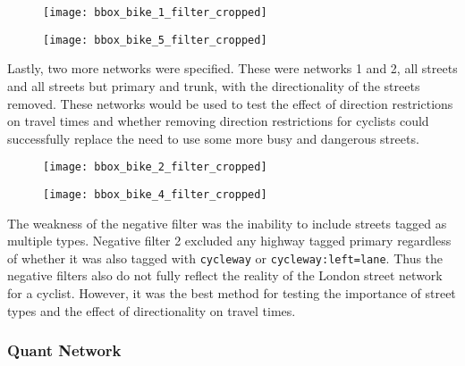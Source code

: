 \begin{figure}
\centering
\begin{minipage}{.5\textwidth}
  \centering
  \texttt{[image: bbox\_bike\_1\_filter\_cropped]}
  \label{fig:sub1}
\end{minipage}%
\begin{minipage}{.5\textwidth}
  \centering
  \texttt{[image: bbox\_bike\_5\_filter\_cropped]}
  \label{fig:sub2}
\end{minipage}
\end{figure}


Lastly, two more networks were specified. These were networks 1 and 2, all streets and all streets but primary and trunk, with the directionality of the streets removed. These networks would be used to test the effect of direction restrictions on travel times and whether removing direction restrictions for cyclists could successfully replace the need to use some more busy and dangerous streets. 

\begin{figure}
\centering
\begin{minipage}{.5\textwidth}
  \centering
  \texttt{[image: bbox\_bike\_2\_filter\_cropped]}
  \label{fig:sub3}
\end{minipage}%
\begin{minipage}{.5\textwidth}
  \centering
  \texttt{[image: bbox\_bike\_4\_filter\_cropped]}
  \label{fig:sub4}
\end{minipage}
\end{figure}



The weakness of the negative filter was the inability to include streets tagged as multiple types. Negative filter 2 excluded any highway tagged primary regardless of whether it was also tagged with \texttt{cycleway} or \texttt{cycleway:left=lane}. Thus the negative filters also do not fully reflect the reality of the London street network for a cyclist. However, it was the best method for testing the importance of street types and the effect of directionality on travel times. 


\subsubsection{Quant Network}

